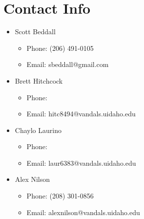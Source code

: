 \documentclass{article}
\begin{document}
\section{Contact Info}
\begin{itemize}
\item Scott Beddall 
  \begin{itemize}
    \item Phone: (206) 491-0105
    \item Email: sbeddall@gmail.com
  \end{itemize}
\item Brett Hitchcock
  \begin{itemize}
    \item Phone: 
    \item Email: hitc8494@vandals.uidaho.edu
  \end{itemize}
\item Chaylo Laurino
  \begin{itemize}
    \item Phone: 
    \item Email: laur6383@vandals.uidaho.edu
  \end{itemize}
\item Alex Nilson
  \begin{itemize}
    \item Phone: (208) 301-0856
    \item Email: alexnilson@vandals.uidaho.edu
  \end{itemize}
\end{itemize}
\end{document}
